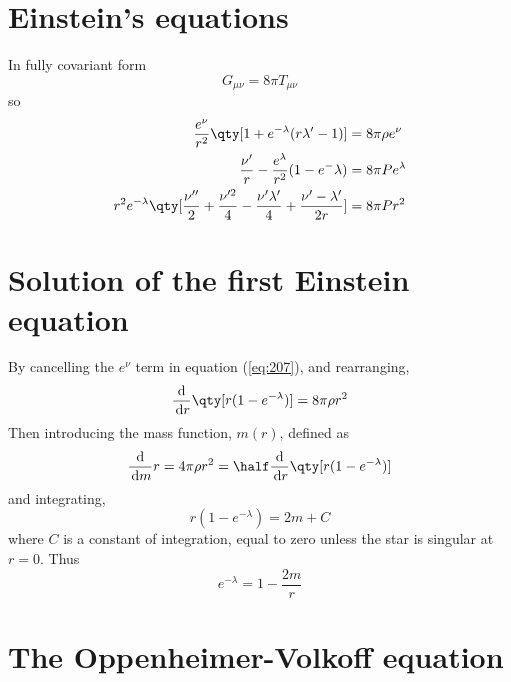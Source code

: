 \section{Einstein's equations}
\label{sec:einsteins-equations-1}

In fully covariant form
\[ G_{\mu \nu} = 8 \pi T_{\mu \nu} \]
so
\begin{subequations}
  \begin{align}
\label{eq:207}
    \frac{e^{\nu}}{r^2} \qty[  1+ e^{-\lambda} (r \lambda' -1) ] &= 8 \pi \rho e^{\nu} \\
\label{eq:208}
    \frac{\nu'}{r} - \frac{e^{\lambda}}{r^2} (1-e^-\lambda) &= 8 \pi P e^{\lambda} \\
\label{eq:209}
r^2 e^{-\lambda} \qty[ \frac{\nu''}{2} + \frac{\nu'^2}{4} - \frac{\nu' \lambda'}{4} + \frac{\nu'-\lambda'}{2r}] &= 8 \pi P r^2
  \end{align}
\end{subequations}

\section{Solution of the first Einstein equation}
\label{sec:solut-first-einst}

By cancelling the $e^{\nu}$ term in equation (\ref{eq:207}), and
rearranging,
\begin{equation}
  \label{eq:210}
  \dv{r} \qty[ r(1-e^{-\lambda})] = 8 \pi \rho r^2
\end{equation}
Then introducing the mass function, $m(r)$, defined as
\begin{equation}
  \label{eq:211}
  \dv{m}{r} = 4 \pi \rho r^2 = \half \dv{r} \qty[r (1-e^{-\lambda})]
\end{equation}
and integrating,
\begin{equation}
  \label{eq:212}
  r(1-e^{-\lambda}) = 2m +C 
\end{equation}
where $C$ is a constant of integration, equal to zero unless the star
is singular at $r=0$. Thus
\begin{equation}
  \label{eq:213}
  e^{-\lambda} = 1 - \frac{2m}{r}
\end{equation}

\section{The Oppenheimer-Volkoff equation}
\label{sec:oppenh-volk-equat}

